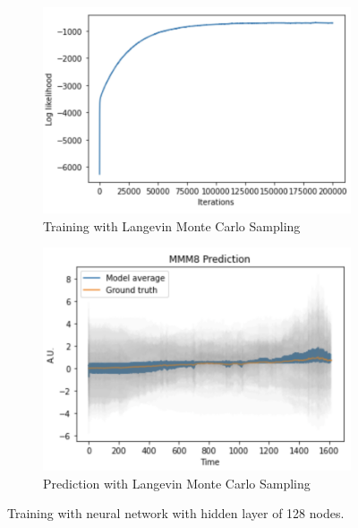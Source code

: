 \documentclass{article}
\begin{document}
\begin{figure}
    \begin{subfigure}[b]{0.5\textwidth}
        \centering
        \includegraphics[width=\textwidth]{../img/training_Langevin_200000_128.png}
        \caption{Training with Langevin Monte Carlo Sampling}
    \end{subfigure}\hfill
    \begin{subfigure}[b]{0.5\textwidth}
        \centering
        \includegraphics[trim={0 0 0 0.7cm}, clip, width=\textwidth]{../img/prediction_Langevin_200000_128.png}
        \caption{Prediction with Langevin Monte Carlo Sampling}
    \end{subfigure}
    \caption{Training with neural network with hidden layer of 128 nodes.}
\end{figure}
\end{document}
